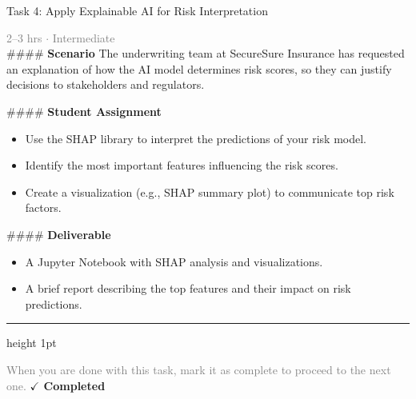 \documentclass[10pt,a4paper]{article}
\begin{document}
\begin{taskbox}{Task 4: Apply Explainable AI for Risk Interpretation}

    {\small \textcolor{gray}{2--3 hrs $\cdot$ Intermediate}}\\[12pt]

    \#\#\#\# \textbf{Scenario}
The underwriting team at SecureSure Insurance has requested an explanation of how the AI model determines risk scores, so they can justify decisions to stakeholders and regulators.

\#\#\#\# \textbf{Student Assignment}
\begin{itemize}
    \item Use the SHAP library to interpret the predictions of your risk model.
    \item Identify the most important features influencing the risk scores.
    \item Create a visualization (e.g., SHAP summary plot) to communicate top risk factors.
\end{itemize}

\#\#\#\# \textbf{Deliverable}
\begin{itemize}
    \item A Jupyter Notebook with SHAP analysis and visualizations.
    \item A brief report describing the top features and their impact on risk predictions.\par
\end{itemize}

    \vspace{16pt}

    \textcolor{cardBorder}{\hrule height 1pt}\vspace{8pt}

    \small \textcolor{gray}{When you are done with this task, mark it as complete to proceed to the next one.} \hfill \textbf{\textcolor{brandDark}{$\checkmark$ Completed}}

\end{taskbox}
\end{document}

